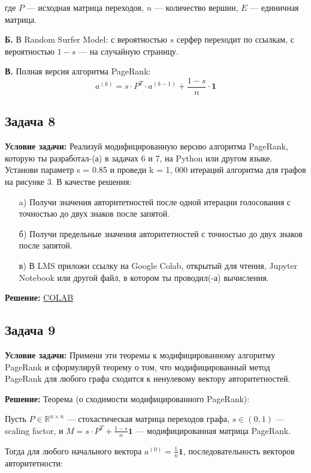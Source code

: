 \documentclass[a4paper,12pt]{article}
\begin{document}
где \( P \) — исходная матрица переходов, \( n \) — количество вершин, \( E \) — единичная матрица.

\textbf{Б.} В Random Surfer Model: с вероятностью \( s \) серфер переходит по ссылкам, с вероятностью \( 1 - s \) — на случайную страницу.

\textbf{В.} Полная версия алгоритма PageRank:
\[
a^{(k)} = s \cdot P^T \cdot a^{(k-1)} + \frac{1 - s}{n} \cdot \mathbf{1}
\]

\subsection{Задача 8}
\textbf{Условие задачи:}
Реализуй модифицированную версию алгоритма PageRank, которую ты разработал-(а) в задачах
6 и 7, на Python или другом языке. Установи параметр s = 0.85 и проведи k = 1, 000 итераций
алгоритма для графов на рисунке 3. В качестве решения:

\begin{itemize}
    \item[a)] Получи значения авторитетностей после одной итерации голосования с точностью до двух знаков
после запятой.
    \item[б)] Получи предельные значения авторитетностей с точностью до двух знаков после запятой.
    \item[в)] В LMS приложи ссылку на Google Colab, открытый для чтения, Jupyter Notebook или другой
файл, в котором ты проводил(-а) вычисления.
\end{itemize}

\textbf{Решение:}
\href{https://colab.research.google.com/drive/1H1bMEVws8LbPNbGYGrFPi2vDS5lYgGls?usp=sharing}{COLAB}
\vspace{1cm}
\subsection{Задача 9}
\textbf{Условие задачи:}
Примени эти теоремы к модифицированному алгоритму PageRank и сформулируй теорему о том,
что модифицированный метод PageRank для любого графа сходится к ненулевому вектору авторитетностей.

\textbf{Решение:}
Теорема (о сходимости модифицированного PageRank):

Пусть \( P \in \mathbb{R}^{n \times n} \) — стохастическая матрица переходов графа, \( s \in (0, 1) \) — scaling factor, и \( M = s \cdot P^T + \frac{1 - s}{n} \mathbf{1} \) — модифицированная матрица PageRank.

Тогда для любого начального вектора \( a^{(0)} = \frac{1}{n} \mathbf{1} \), последовательность векторов авторитетности:
\end{document}
